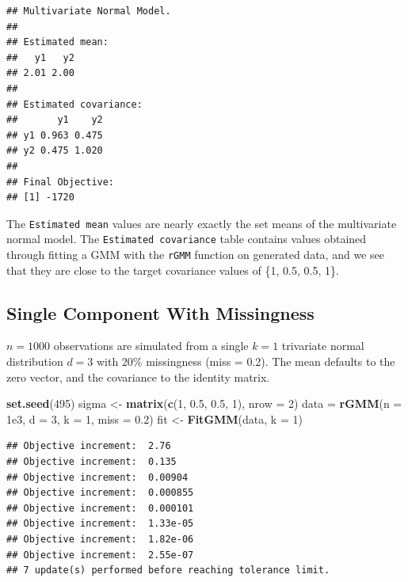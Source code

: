 \documentclass[12pt]{article}
\newenvironment{Shaded}{\begin{snugshade}}{\end{snugshade}}
\newcommand{\AttributeTok}[1]{\textcolor[rgb]{0.13,0.29,0.53}{#1}}
\newcommand{\DecValTok}[1]{\textcolor[rgb]{0.00,0.00,0.81}{#1}}
\newcommand{\FloatTok}[1]{\textcolor[rgb]{0.00,0.00,0.81}{#1}}
\newcommand{\FunctionTok}[1]{\textcolor[rgb]{0.13,0.29,0.53}{\textbf{#1}}}
\newcommand{\NormalTok}[1]{#1}
\newcommand{\OtherTok}[1]{\textcolor[rgb]{0.56,0.35,0.01}{#1}}
\begin{document}
\begin{verbatim}
## Multivariate Normal Model. 
## 
## Estimated mean:
##   y1   y2 
## 2.01 2.00 
## 
## Estimated covariance:
##       y1    y2
## y1 0.963 0.475
## y2 0.475 1.020
## 
## Final Objective:
## [1] -1720
\end{verbatim}

The \texttt{Estimated\ mean} values are nearly exactly the set means of
the multivariate normal model. The \texttt{Estimated\ covariance} table
contains values obtained through fitting a GMM with the \texttt{rGMM}
function on generated data, and we see that they are close to the target
covariance values of \{1, 0.5, 0.5, 1\}.

\hypertarget{single-component-with-missingness}{%
\subsection{Single Component With
Missingness}\label{single-component-with-missingness}}

\(n = 1000\) observations are simulated from a single \(k = 1\)
trivariate normal distribution \(d = 3\) with 20\% missingness (miss =
0.2). The mean defaults to the zero vector, and the covariance to the
identity matrix.

\begin{Shaded}
\begin{Highlighting}[]
\FunctionTok{set.seed}\NormalTok{(}\DecValTok{495}\NormalTok{)}
\NormalTok{sigma }\OtherTok{\textless{}{-}} \FunctionTok{matrix}\NormalTok{(}\FunctionTok{c}\NormalTok{(}\DecValTok{1}\NormalTok{, }\FloatTok{0.5}\NormalTok{, }\FloatTok{0.5}\NormalTok{, }\DecValTok{1}\NormalTok{), }\AttributeTok{nrow =} \DecValTok{2}\NormalTok{)}
\NormalTok{data }\OtherTok{=} \FunctionTok{rGMM}\NormalTok{(}\AttributeTok{n =} \FloatTok{1e3}\NormalTok{, }\AttributeTok{d =} \DecValTok{3}\NormalTok{, }\AttributeTok{k =} \DecValTok{1}\NormalTok{, }\AttributeTok{miss =} \FloatTok{0.2}\NormalTok{)}
\NormalTok{fit }\OtherTok{\textless{}{-}} \FunctionTok{FitGMM}\NormalTok{(data, }\AttributeTok{k =} \DecValTok{1}\NormalTok{)}
\end{Highlighting}
\end{Shaded}

\begin{verbatim}
## Objective increment:  2.76 
## Objective increment:  0.135 
## Objective increment:  0.00904 
## Objective increment:  0.000855 
## Objective increment:  0.000101 
## Objective increment:  1.33e-05 
## Objective increment:  1.82e-06 
## Objective increment:  2.55e-07 
## 7 update(s) performed before reaching tolerance limit.
\end{verbatim}
\end{document}
